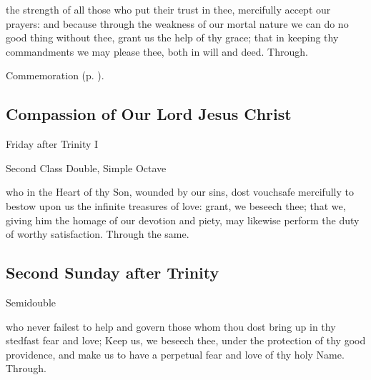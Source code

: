 \collect
{} the strength of all those who put their trust in thee, mercifully accept our prayers: and because through the weakness of our mortal nature we can do no good thing without thee, grant us the help of thy grace; that in keeping thy commandments we may please thee, both in will and deed. Through.

\begin{rubric}
	Commemoration  (p. \pageref{CorpusChristiCollect}).
\end{rubric}


\subsection{Compassion of Our Lord Jesus Christ}
\begin{inhead}
	{Friday after Trinity I}\par
    {Second Class Double, Simple Octave}
\end{inhead}

\collect
{} who in the Heart of thy Son, wounded by our sins, dost vouchsafe mercifully to bestow upon us the infinite treasures of love: grant, we beseech thee; that we, giving him the homage of our devotion and piety, may likewise perform the duty of worthy satisfaction. Through the same.


\subsection{Second Sunday after Trinity}
\begin{inhead}
    {Semidouble}
\end{inhead}




\collect
{} who never failest to help and govern those whom thou dost bring up in thy stedfast fear and love; Keep us, we beseech thee, under the protection of thy good providence, and make us to have a perpetual fear and love of thy holy Name. Through.


